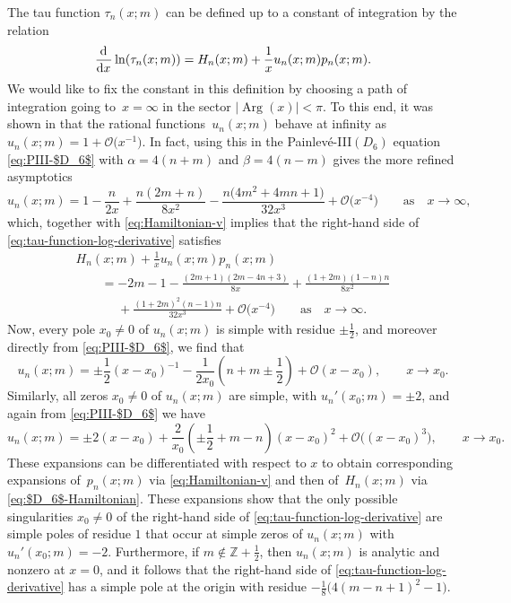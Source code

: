\documentclass[pdftex]{sigma}
\numberwithin{equation}{section}
\newcommand\lb{\left(}
\newcommand\rb{\right)}
\renewcommand{\arg}{\operatorname{Arg}}
\begin{document}
The tau function $\tau_n(x;m)$ can be defined up to a constant of integration by the relation
\begin{equation}
\dod{}{x}\ln(\tau_n(x;m))=H_n(x;m)+\frac{1}{x}u_n(x;m)p_n(x;m).
\label{eq:tau-function-log-derivative}
\end{equation}
We would like to fix the constant in this definition by choosing a path of integration going to~$x=\infty$ in the sector $|{\arg}(x)|<\pi$. To this end, it was shown in \cite{BMS18} that the rational functions~$u_n(x;m)$ behave at infinity as $u_n(x;m)=1+\mathcal{O}\big(x^{-1}\big)$. In fact, using this in the Painlev\'e-III$(D_6)$ equation \eqref{eq:PIII-$D_6$} with $\alpha=4(n+m)$ and $\beta=4(n-m)$ gives the more refined asymptotics
\begin{equation*}
 u_n(x;m)=1-\frac{n}{2x}+\frac{n(2m+n)}{8x^2} -\frac{n\big(4m^2+4mn+1\big)}{32x^3}+\mathcal{O}\big(x^{-4}\big) \qquad \text{as} \quad x\to \infty,
\end{equation*}
which, together with \eqref{eq:Hamiltonian-v} implies that the right-hand side of \eqref{eq:tau-function-log-derivative} satisfies
\begin{gather}
H_n(x;m)+\frac{1}{x}u_n(x;m)p_n(x;m) \nonumber\\
\qquad=-2 m-1-\frac{(2 m+1) (2 m-4 n+3)}{8 x}+\frac{(1+2m)(1-n)n}{8x^2}\nonumber\\
\phantom{\qquad=}{}+\frac{(1+2m)^2(n-1)n}{32x^3}+\mathcal{O}\big(x^{-4}\big) \qquad \text{as} \quad x\to \infty.
\label{eq:tau-function-log-derivative-expansion}
\end{gather}
Now, every pole $x_0\neq 0$ of $u_n(x;m)$ is simple with residue $\pm\frac{1}{2}$, and moreover
directly from \eqref{eq:PIII-$D_6$}, we find that
\[
u_n(x;m)=\pm\frac{1}{2}(x-x_0)^{-1} -\frac{1}{2x_0}\left(n+m\pm\frac{1}{2}\right)+\mathcal{O}(x-x_0),\qquad x\to x_0.
\]
Similarly, all zeros $x_0\neq 0$ of $u_n(x;m)$ are simple, with $u_n'(x_0;m)=\pm 2$, and again from \eqref{eq:PIII-$D_6$} we have
\[
u_n(x;m)=\pm 2(x-x_0)+\frac{2}{x_0}\lb \pm \frac{1}{2} +m-n\rb (x-x_0)^2 + \mathcal{O}\big((x-x_0)^3\big),\qquad x\to x_0.
\]
These expansions can be differentiated with respect to $x$ to obtain corresponding expansions of~$p_n(x;m)$ via \eqref{eq:Hamiltonian-v} and then of~$H_n(x;m)$ via \eqref{eq:$D_6$-Hamiltonian}. These expansions show that the only possible singularities $x_0\neq 0$ of the right-hand side of \eqref{eq:tau-function-log-derivative} are simple poles of residue $1$ that occur at simple zeros of $u_n(x;m)$ with $u_n'(x_0;m)=-2$. Furthermore, if $m\not\in\mathbb{Z}+\frac{1}{2}$, then $u_n(x;m)$ is analytic and nonzero at $x=0$, and it follows that the right-hand side of \eqref{eq:tau-function-log-derivative} has a simple pole at the origin with residue $-\frac{1}{8}\big(4(m-n+1)^2-1\big)$.
\end{document}

